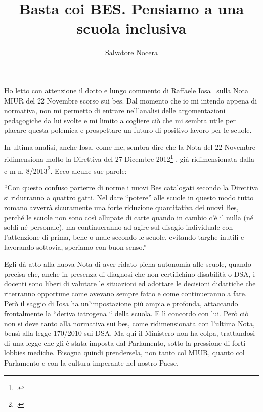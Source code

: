 \author{Salvatore Nocera}
\title{Basta coi BES. Pensiamo a una scuola inclusiva}
\label{cha:nocera021213}
\maketitle
{}
Ho letto con attenzione il dotto e lungo commento di Raffaele Iosa~\pageref{cha:Iosa281113} sulla Nota MIUR del 22 Novembre scorso sui bes. Dal momento che io mi intendo appena di normativa, non mi permetto di entrare nell’analisi delle argomentazioni pedagogiche da lui svolte e mi limito a cogliere ciò che mi sembra utile per placare questa polemica e prospettare un futuro di positivo lavoro per le scuole.

In ultima analisi, anche Iosa, come me, sembra dire che la Nota del 22 Novembre ridimensiona molto la Direttiva del 27 Dicembre 2012\footcite{dir27Dic2012} , già ridimensionata dalla c m n. 8/2013\footcite{cm8_2013}. Ecco alcune sue parole:

“Con questo confuso parterre di norme i nuovi Bes catalogati secondo la Direttiva si ridurranno a quattro gatti. Nel dare “potere” alle scuole in questo modo tutto romano avverrà sicuramente una forte riduzione quantitativa dei nuovi Bes, perché le scuole non sono così allupate di carte quando in cambio c’è il nulla (né soldi né personale), ma continueranno ad agire sul disagio individuale con l’attenzione di prima, bene o male secondo le scuole, evitando targhe inutili e lavorando sottovia, speriamo con buon senso.”

Egli dà atto alla nuova Nota di aver ridato piena autonomia alle scuole, quando precisa che, anche in presenza di diagnosi che non certifichino disabilità o DSA, i docenti sono liberi di valutare le situazioni ed adottare le decisioni didattiche che riterranno opportune come avevano sempre fatto e come continueranno a fare. Però il saggio di Iosa ha un’impostazione più ampia e profonda, attaccando frontalmente la “deriva iatrogena “ della scuola. E lì concordo con lui. Però ciò non si deve tanto alla normativa sui bes, come ridimensionata con l’ultima Nota, bensì alla legge 170/2010 sui DSA. Ma qui il Ministero non ha colpa, trattandosi di una legge che gli è stata imposta dal Parlamento, sotto la pressione di forti lobbies mediche. Bisogna quindi prendersela, non tanto col MIUR, quanto col Parlamento e con la cultura imperante nel nostro Paese.

